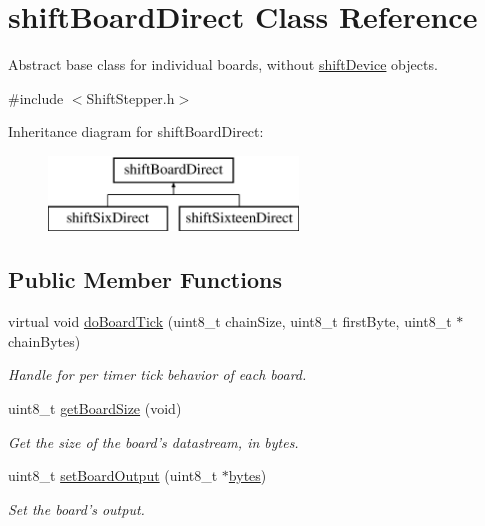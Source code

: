 \hypertarget{classshift_board_direct}{
\section{shiftBoardDirect Class Reference}
\label{classshift_board_direct}
}


Abstract base class for individual boards, without \hyperlink{classshift_device}{shiftDevice} objects.  




{\ttfamily \#include $<$ShiftStepper.h$>$}

Inheritance diagram for shiftBoardDirect:\begin{figure}[H]
\begin{center}
\leavevmode
\includegraphics[height=2.000000cm]{classshift_board_direct}
\end{center}
\end{figure}
\subsection*{Public Member Functions}
\begin{DoxyCompactItemize}
\item 
virtual void \hyperlink{classshift_board_direct_a96cf7c0cd6c4d138d9458eeee30ec89d}{doBoardTick} (uint8\_\-t chainSize, uint8\_\-t firstByte, uint8\_\-t $\ast$chainBytes)
\begin{DoxyCompactList}\small\item\em Handle for per timer tick behavior of each board. \item\end{DoxyCompactList}\item 
uint8\_\-t \hyperlink{classshift_board_direct_a3138cbbc274b4bccb55e65b7be75ca67}{getBoardSize} (void)
\begin{DoxyCompactList}\small\item\em Get the size of the board's datastream, in bytes. \item\end{DoxyCompactList}\item 
uint8\_\-t \hyperlink{classshift_board_direct_a2b309e68e183ea2e598751b6e7ef2b5d}{setBoardOutput} (uint8\_\-t $\ast$\hyperlink{classshift_board_direct_ab71f1de9ff5b1324445099f001ce7231}{bytes})
\begin{DoxyCompactList}\small\item\em Set the board's output. \item\end{DoxyCompactList}\end{DoxyCompactItemize}
